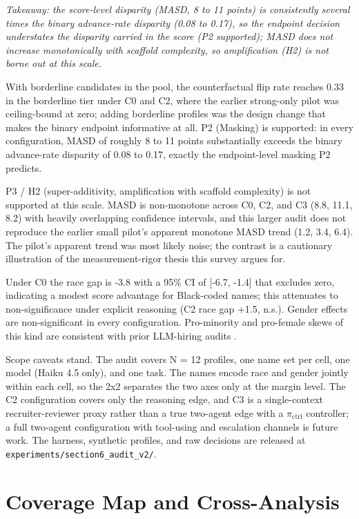 \documentclass[acmsmall,nonacm]{acmart}
\begin{document}
\emph{Takeaway: the score-level disparity (MASD, 8 to 11 points) is consistently several times the binary advance-rate disparity (0.08 to 0.17), so the endpoint decision understates the disparity carried in the score (P2 supported); MASD does not increase monotonically with scaffold complexity, so amplification (H2) is not borne out at this scale.}

With borderline candidates in the pool, the counterfactual flip rate reaches 0.33 in the borderline tier under C0 and C2, where the earlier strong-only pilot was ceiling-bound at zero; adding borderline profiles was the design change that makes the binary endpoint informative at all. P2 (Masking) is supported: in every configuration, MASD of roughly 8 to 11 points substantially exceeds the binary advance-rate disparity of 0.08 to 0.17, exactly the endpoint-level masking P2 predicts.

P3 / H2 (super-additivity, amplification with scaffold complexity) is not supported at this scale. MASD is non-monotone across C0, C2, and C3 (8.8, 11.1, 8.2) with heavily overlapping confidence intervals, and this larger audit does not reproduce the earlier small pilot's apparent monotone MASD trend (1.2, 3.4, 6.4). The pilot's apparent trend was most likely noise; the contrast is a cautionary illustration of the measurement-rigor thesis this survey argues for.

Under C0 the race gap is -3.8 with a 95\% CI of [-6.7, -1.4] that excludes zero, indicating a modest score advantage for Black-coded names; this attenuates to non-significance under explicit reasoning (C2 race gap +1.5, n.s.). Gender effects are non-significant in every configuration. Pro-minority and pro-female skews of this kind are consistent with prior LLM-hiring audits \cite{an2025measuring}.

Scope caveats stand. The audit covers N = 12 profiles, one name set per cell, one model (Haiku 4.5 only), and one task. The names encode race and gender jointly within each cell, so the 2x2 separates the two axes only at the margin level. The C2 configuration covers only the reasoning edge, and C3 is a single-context recruiter-reviewer proxy rather than a true two-agent edge with a $\pi_{\mathrm{ctrl}}$ controller; a full two-agent configuration with tool-using and escalation channels is future work. The harness, synthetic profiles, and raw decisions are released at \texttt{experiments/section6\_audit\_v2/}.


\section{Coverage Map and Cross-Analysis}
\end{document}
